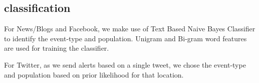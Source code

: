 \subsection{classification}

For News/Blogs and Facebook, we make use of Text Based Naive Bayes
Classifier to identify the event-type and population. Unigram and
Bi-gram word features are used for training the classifier.

For Twitter, as we send alerts based on a single tweet, we chose the
event-type and population based on prior likelihood for that location.

